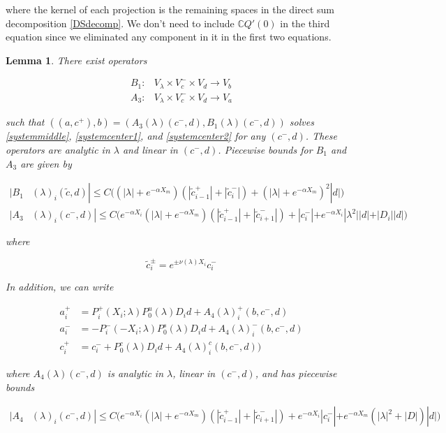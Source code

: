 \documentclass[12pt]{article}
\def\C{{\mathbb C}}
\newtheorem{lemma}{Lemma}
\begin{document}
where the kernel of each projection is the remaining spaces in the direct sum decomposition \eqref{DSdecomp}. We don't need to include $\C Q'(0)$ in the third equation since we eliminated any component in it in the first two equations.


\begin{lemma}\label{inv2}
There exist operators

\begin{align*}
B_1: &V_\lambda \times V_c^- \times V_d \rightarrow V_b \\
A_3: &V_\lambda \times V_c^- \times V_d \rightarrow V_a 
\end{align*}

such that $( (a, c^+) , b ) = ( A_3(\lambda)(c^-,d), B_1(\lambda)(c^-, d) )$ solves \eqref{systemmiddle}, \eqref{systemcenter1}, and \eqref{systemcenter2} for any $(c^-, d)$. These operators are analytic in $\lambda$ and linear in $(c^-,d)$. Piecewise bounds for $B_1$ and $A_3$ are given by

\begin{align}
|B_1&(\lambda)_i(\tilde{c}, d)| \leq C \Big( (|\lambda| + e^{-\alpha X_m})(|\tilde{c}_{i-1}^+| + |\tilde{c}_i^-|)+ (|\lambda| + e^{-\alpha X_m})^2 |d| \Big) \\
|A_3&(\lambda)_i(c^-, d)|
\leq C \Big(  
e^{-\alpha X_i} (|\lambda| + e^{-\alpha X_m})(|\tilde{c}_{i-1}^+| + |\tilde{c}_{i+1}^-|) +|c_i^-| + e^{-\alpha X_i} |\lambda^2||d| + |D_i||d| \Big)
\end{align} 

where

\begin{equation}\label{tildec}
\tilde{c}_i^\pm = e^{\pm \nu(\lambda) X_i} c_i^-
\end{equation}

In addition, we can write

\begin{align*}
a_i^+ &= P_i^+(X_i; \lambda) P_0^u(\lambda) D_i d + A_4(\lambda)_i^+(b, c^-, d) \\
a_i^- &= -P_i^-(-X_i; \lambda) P_0^s(\lambda) D_i d + A_4(\lambda)_i^-(b, c^-, d) \\
c_i^+ &= c_i^- + P_0^c(\lambda) D_i d + A_4(\lambda)_i^c(b, c^-, d) )
\end{align*}

where $A_4(\lambda)(c^-, d)$ is analytic in $\lambda$, linear in $(c^-, d)$, and has piecewise bounds

\begin{align}
|A_4&(\lambda)_i(c^-, d)|
\leq C \Big( 
e^{-\alpha X_i} (|\lambda| + e^{-\alpha X_m})(|\tilde{c}_{i-1}^+| + |\tilde{c}_{i+1}^-|) + e^{-\alpha X_i} |c_i^-| + e^{-\alpha X_m}(|\lambda|^2 + |D|)|d| \Big)
\end{align}


\end{lemma}
\end{document}
